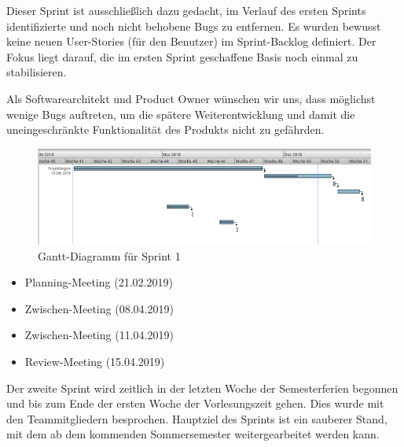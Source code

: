 Dieser Sprint ist ausschließlich dazu gedacht, im Verlauf des ersten Sprints identifizierte und noch nicht behobene Bugs zu entfernen. Es wurden bewusst keine neuen User-Stories (für den Benutzer) im Sprint-Backlog definiert. Der Fokus liegt darauf, die im ersten Sprint geschaffene Basis noch einmal zu stabilisieren.
\nsecend

Als Softwarearchitekt und Product Owner wünschen wir uns, dass möglichst wenige Bugs auftreten, um die spätere Weiterentwicklung und damit die uneingeschränkte Funktionalität des Produkts nicht zu gefährden.
\nsecend
\nsecend %

\begin{figure}[hbtp]
\centering
\includegraphics[width=\textwidth]{Bilder/gantt}
\caption{Gantt-Diagramm für Sprint 1}
\end{figure}
\nsecend%

\begin{itemize}
\item Planning-Meeting (21.02.2019)
\item Zwischen-Meeting (08.04.2019)
\item Zwischen-Meeting (11.04.2019)
\item Review-Meeting (15.04.2019)
\end{itemize}
\nsecend%

Der zweite Sprint wird zeitlich in der letzten Woche der Semesterferien begonnen und bis zum Ende der ersten Woche der Vorlesungszeit gehen. Dies wurde mit den Teammitgliedern besprochen. Hauptziel des Sprints ist ein sauberer Stand, mit dem ab dem kommenden Sommersemester weitergearbeitet werden kann.
\nsecend

